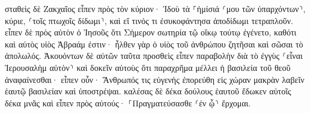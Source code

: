 \documentclass{openreader}
\begin{document}
σταθεὶς δὲ Ζακχαῖος εἶπεν πρὸς τὸν κύριον· Ἰδοὺ τὰ ⸀ἡμίσιά ⸂μου τῶν ὑπαρχόντων⸃, κύριε, ⸂τοῖς πτωχοῖς δίδωμι⸃, καὶ εἴ τινός τι ἐσυκοφάντησα ἀποδίδωμι τετραπλοῦν. 
εἶπεν δὲ πρὸς αὐτὸν ὁ Ἰησοῦς ὅτι Σήμερον σωτηρία τῷ οἴκῳ τούτῳ ἐγένετο, καθότι καὶ αὐτὸς υἱὸς Ἀβραάμ ἐστιν· 
ἦλθεν γὰρ ὁ υἱὸς τοῦ ἀνθρώπου ζητῆσαι καὶ σῶσαι τὸ ἀπολωλός. 
Ἀκουόντων δὲ αὐτῶν ταῦτα προσθεὶς εἶπεν παραβολὴν διὰ τὸ ἐγγὺς ⸂εἶναι Ἰερουσαλὴμ αὐτὸν⸃ καὶ δοκεῖν αὐτοὺς ὅτι παραχρῆμα μέλλει ἡ βασιλεία τοῦ θεοῦ ἀναφαίνεσθαι· 
εἶπεν οὖν· Ἄνθρωπός τις εὐγενὴς ἐπορεύθη εἰς χώραν μακρὰν λαβεῖν ἑαυτῷ βασιλείαν καὶ ὑποστρέψαι. 
καλέσας δὲ δέκα δούλους ἑαυτοῦ ἔδωκεν αὐτοῖς δέκα μνᾶς καὶ εἶπεν πρὸς αὐτούς· ⸀Πραγματεύσασθε ⸂ἐν ᾧ⸃ ἔρχομαι. 
\end{document}
